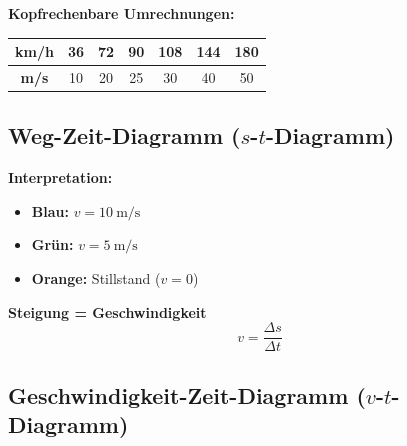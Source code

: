 \documentclass[11pt, a4paper]{article}
\begin{document}
\begin{beispielbox}
\textbf{Kopfrechenbare Umrechnungen:}

\begin{center}
\begin{tabular}{|c|c|c|c|c|c|c|}
\hline
\textbf{km/h} & 36 & 72 & 90 & 108 & 144 & 180 \\
\hline
\textbf{m/s} & 10 & 20 & 25 & 30 & 40 & 50 \\
\hline
\end{tabular}
\end{center}
\end{beispielbox}

\subsection{Weg-Zeit-Diagramm ($s$-$t$-Diagramm)}

\begin{minipage}{0.55\textwidth}
\end{minipage}
\hfill
\begin{minipage}{0.4\textwidth}
\textbf{Interpretation:}
\begin{itemize}[leftmargin=1em]
    \item \textcolor{physik}{\textbf{Blau:}} $v = \SI{10}{\metre\per\second}$
    \item \textcolor{success}{\textbf{Grün:}} $v = \SI{5}{\metre\per\second}$
    \item \textcolor{warning}{\textbf{Orange:}} Stillstand ($v = 0$)
\end{itemize}

\vspace{0.5em}
\textbf{Steigung = Geschwindigkeit}
$$v = \frac{\Delta s}{\Delta t}$$
\end{minipage}

\subsection{Geschwindigkeit-Zeit-Diagramm ($v$-$t$-Diagramm)}
\end{document}
